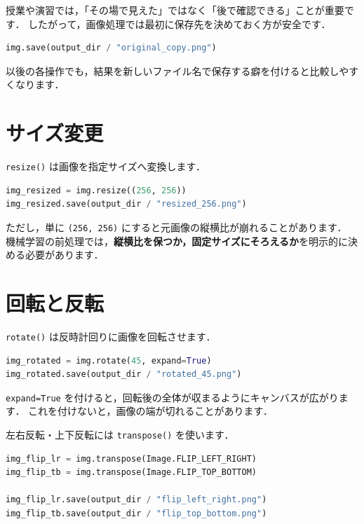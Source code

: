授業や演習では，「その場で見えた」ではなく「後で確認できる」ことが重要です．
したがって，画像処理では最初に保存先を決めておく方が安全です．

\begin{lstlisting}[style=codecell,language=Python]
img.save(output_dir / "original_copy.png")
\end{lstlisting}

以後の各操作でも，結果を新しいファイル名で保存する癖を付けると比較しやすくなります．


\section{サイズ変更}

\texttt{resize()} は画像を指定サイズへ変換します．

\begin{lstlisting}[style=codecell,language=Python]
img_resized = img.resize((256, 256))
img_resized.save(output_dir / "resized_256.png")
\end{lstlisting}

ただし，単に \texttt{(256, 256)} にすると元画像の縦横比が崩れることがあります．
機械学習の前処理では，\textbf{縦横比を保つか，固定サイズにそろえるか}を明示的に決める必要があります．


\section{回転と反転}

\texttt{rotate()} は反時計回りに画像を回転させます．

\begin{lstlisting}[style=codecell,language=Python]
img_rotated = img.rotate(45, expand=True)
img_rotated.save(output_dir / "rotated_45.png")
\end{lstlisting}

\texttt{expand=True} を付けると，回転後の全体が収まるようにキャンバスが広がります．
これを付けないと，画像の端が切れることがあります．

左右反転・上下反転には \texttt{transpose()} を使います．

\begin{lstlisting}[style=codecell,language=Python]
img_flip_lr = img.transpose(Image.FLIP_LEFT_RIGHT)
img_flip_tb = img.transpose(Image.FLIP_TOP_BOTTOM)

img_flip_lr.save(output_dir / "flip_left_right.png")
img_flip_tb.save(output_dir / "flip_top_bottom.png")
\end{lstlisting}

